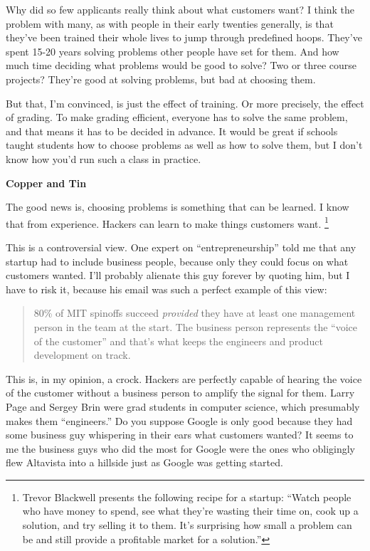 \documentclass[12pt]{book}
\begin{document}
Why did so few applicants really think about what customers want? I
think the problem with many, as with people in their early twenties
generally, is that they've been trained their whole lives to jump
through predefined hoops. They've spent 15-20 years solving problems
other people have set for them. And how much time deciding what problems
would be good to solve? Two or three course projects? They're good at
solving problems, but bad at choosing them.

But that, I'm convinced, is just the effect of training. Or more
precisely, the effect of grading. To make grading efficient, everyone
has to solve the same problem, and that means it has to be decided in
advance. It would be great if schools taught students how to choose
problems as well as how to solve them, but I don't know how you'd run
such a class in practice.

\textbf{Copper and Tin}

The good news is, choosing problems is something that can be learned. I
know that from experience. Hackers can learn to make things customers
want. \footnote{Trevor Blackwell presents the following recipe for a startup:
``Watch people who have money to spend, see what they're wasting their
time on, cook up a solution, and try selling it to them. It's surprising
how small a problem can be and still provide a profitable market for a
solution.''}

This is a controversial view. One expert on ``entrepreneurship'' told me
that any startup had to include business people, because only they could
focus on what customers wanted. I'll probably alienate this guy forever
by quoting him, but I have to risk it, because his email was such a
perfect example of this view:

\begin{quote}
80\% of MIT spinoffs succeed \emph{provided} they have at least one
management person in the team at the start. The business person
represents the ``voice of the customer'' and that's what keeps the
engineers and product development on track.
\end{quote}

This is, in my opinion, a crock. Hackers are perfectly capable of
hearing the voice of the customer without a business person to amplify
the signal for them. Larry Page and Sergey Brin were grad students in
computer science, which presumably makes them ``engineers.'' Do you
suppose Google is only good because they had some business guy
whispering in their ears what customers wanted? It seems to me the
business guys who did the most for Google were the ones who obligingly
flew Altavista into a hillside just as Google was getting started.
\end{document}
